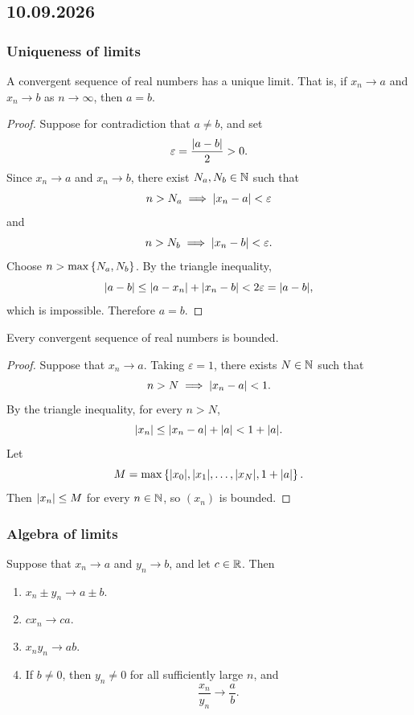 \documentclass[11pt,a4paper]{amsart}
\begin{document}
\subsection{10.09.2026}

\subsubsection{Uniqueness of limits}

\begin{theorem}
  A convergent sequence of real numbers has a unique limit. That is, if
  \(x_n \to a\) and \(x_n \to b\) as \(n \to \infty\), then \(a=b\).
\end{theorem}

\begin{proof}
  Suppose for contradiction that \(a\neq b\), and set
  \[
    \varepsilon=\frac{\lvert a-b\rvert}{2}>0.
  \]
  Since \(x_n\to a\) and \(x_n\to b\), there exist \(N_a,N_b\in\mathbb{N}\) such
  that
  \[
    n>N_a \implies \lvert x_n-a\rvert<\varepsilon
  \]
  and
  \[
    n>N_b \implies \lvert x_n-b\rvert<\varepsilon.
  \]
  Choose \(n>\max\left\lbrace N_a,N_b\right\rbrace\). By the triangle inequality,
  \[
    \lvert a-b\rvert
    \leq \lvert a-x_n\rvert+\lvert x_n-b\rvert
    < 2\varepsilon
    =\lvert a-b\rvert,
  \]
  which is impossible. Therefore \(a=b\).
\end{proof}

\begin{theorem}
  Every convergent sequence of real numbers is bounded.
\end{theorem}

\begin{proof}
  Suppose that \(x_n\to a\). Taking \(\varepsilon=1\), there exists
  \(N\in\mathbb{N}\) such that
  \[
    n>N \implies \lvert x_n-a\rvert<1.
  \]
  By the triangle inequality, for every \(n>N\),
  \[
    \lvert x_n\rvert
    \leq \lvert x_n-a\rvert+\lvert a\rvert
    <1+\lvert a\rvert.
  \]
  Let
  \[
    M=\max\left\lbrace\lvert x_0\rvert,\lvert x_1\rvert,\ldots,\lvert x_N\rvert,1+\lvert a\rvert\right\rbrace.
  \]
  Then \(\lvert x_n\rvert\leq M\) for every \(n\in\mathbb{N}\), so \((x_n)\) is
  bounded.
\end{proof}

\subsubsection{Algebra of limits}

\begin{theorem}
  Suppose that \(x_n\to a\) and \(y_n\to b\), and let \(c\in\mathbb{R}\). Then
  \begin{enumerate}
    \item \(x_n\pm y_n\to a\pm b\).
    \item \(cx_n\to ca\).
    \item \(x_ny_n\to ab\).
    \item If \(b\neq0\), then \(y_n\neq0\) for all sufficiently large
      \(n\), and
      \[
        \frac{x_n}{y_n}\to\frac{a}{b}.
      \]
  \end{enumerate}
\end{theorem}
\end{document}
